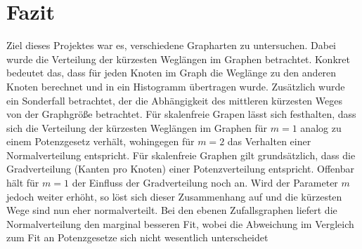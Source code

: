 \documentclass[10pt]{article}
\begin{document}
\section{Fazit}
Ziel dieses Projektes war es, verschiedene Grapharten zu untersuchen. Dabei wurde die Verteilung der kürzesten Weglängen im Graphen betrachtet. Konkret bedeutet das, dass für jeden Knoten im Graph die Weglänge zu den anderen Knoten berechnet und in ein Histogramm übertragen wurde.
Zusätzlich wurde ein Sonderfall betrachtet, der die Abhängigkeit des mittleren kürzesten Weges von der Graphgröße betrachtet. Für skalenfreie Grapen lässt sich festhalten, dass sich die Verteilung der kürzesten Weglängen im Graphen für $m=1$ analog zu einem Potenzgesetz verhält, wohingegen für $m=2$ das Verhalten einer Normalverteilung entspricht. Für skalenfreie Graphen gilt grundsätzlich, dass die Gradverteilung (Kanten pro Knoten) einer Potenzverteilung entspricht. Offenbar hält für $m=1$ der Einfluss der Gradverteilung noch an. Wird der Parameter $m$ jedoch weiter erhöht, so löst sich dieser Zusammenhang auf und die kürzesten Wege sind nun eher normalverteilt. 
Bei den ebenen Zufallsgraphen liefert die Normalverteilung den marginal besseren Fit, wobei die Abweichung im Vergleich zum Fit an Potenzgesetze sich nicht wesentlich unterscheidet

\newpage

 

\end{document}
